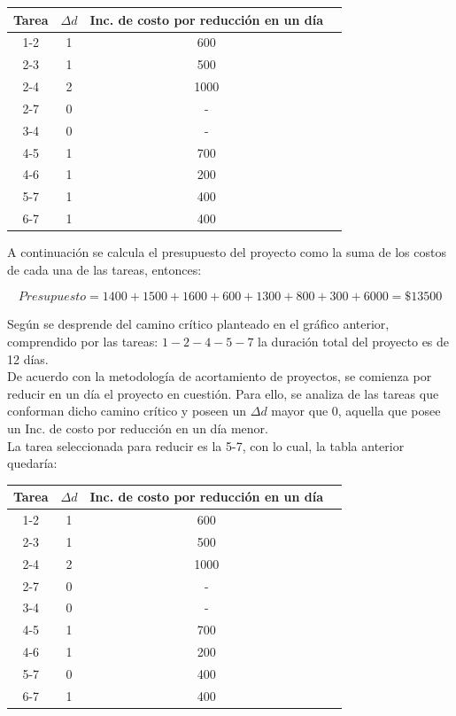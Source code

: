 \documentclass[a4paper,10pt]{article}
\begin{document}
   \begin{center}
   \begin{tabular}{|| c | c | c | c ||}
   \hline 
      Tarea & $\Delta d$ & Inc. de costo por reducci\'on en un d\'ia \\ \hline \hline
      1-2 & 1 & 600  \\ \hline
      2-3 & 1 & 500  \\ \hline 
      2-4 & 2 & 1000  \\ \hline
      2-7 & 0 & - \\ \hline
      3-4 & 0 & - \\ \hline
      4-5 & 1 & 700 \\ \hline
      4-6 & 1 & 200 \\ \hline
      5-7 & 1 & 400    \\ \hline
      6-7 & 1 & 400\\ \hline
   \end{tabular}
   \end{center}

A continuaci\'on se calcula el presupuesto del proyecto como la suma de los costos de cada una de las tareas, entonces:

$$ Presupuesto = 1400 + 1500 + 1600 + 600 + 1300 + 800 + 300 + 6000 = \$13500$$

Seg\'un se desprende del camino cr\'itico planteado en el gr\'afico anterior, comprendido por las tareas: $1-2-4-5-7$ la duraci\'on total del proyecto es de 12 d\'ias.
\\
De acuerdo con la metodolog\'ia de acortamiento de proyectos, se comienza por reducir en un d\'ia el proyecto en cuesti\'on. Para ello, se analiza de las tareas que conforman dicho camino cr\'itico 
y poseen un $\Delta d$ mayor que 0, aquella que posee un Inc. de costo por reducci\'on en un d\'ia menor.\\

La tarea seleccionada para reducir es la 5-7, con lo cual, la tabla anterior quedar\'ia:


   \begin{center}
   \begin{tabular}{|| c | c | c | c ||}
   \hline 
      Tarea & $\Delta d$ & Inc. de costo por reducci\'on en un d\'ia \\ \hline \hline
      1-2 & 1 & 600  \\ \hline
      2-3 & 1 & 500  \\ \hline 
      2-4 & 2 & 1000  \\ \hline
      2-7 & 0 & - \\ \hline
      3-4 & 0 & - \\ \hline
      4-5 & 1 & 700 \\ \hline
      4-6 & 1 & 200 \\ \hline
      5-7 & 0 & 400    \\ \hline
      6-7 & 1 & 400\\ \hline
   \end{tabular}
   \end{center}
\end{document}
